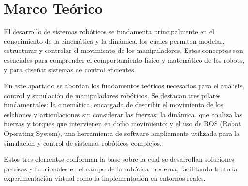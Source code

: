 \chapter{Marco Teórico} 
\label{chap:marco_teorico}

El desarrollo de sistemas robóticos se fundamenta principalmente en el conocimiento de la cinemática y la dinámica, los cuales permiten modelar, estructurar y controlar el movimiento de los manipuladores. Estos conceptos son esenciales para comprender el comportamiento físico y matemático de los robots, y para diseñar sistemas de control eficientes.

En este apartado se abordan los fundamentos teóricos necesarios para el análisis, control y simulación de manipuladores robóticos. Se destacan tres pilares fundamentales: la cinemática, encargada de describir el movimiento de los eslabones y articulaciones sin considerar las fuerzas; la dinámica, que analiza las fuerzas y torques que intervienen en dicho movimiento; y el uso de ROS (Robot Operating System), una herramienta de software ampliamente utilizada para la simulación y control de sistemas robóticos complejos.

Estos tres elementos conforman la base sobre la cual se desarrollan soluciones precisas y funcionales en el campo de la robótica moderna, facilitando tanto la experimentación virtual como la implementación en entornos reales.

